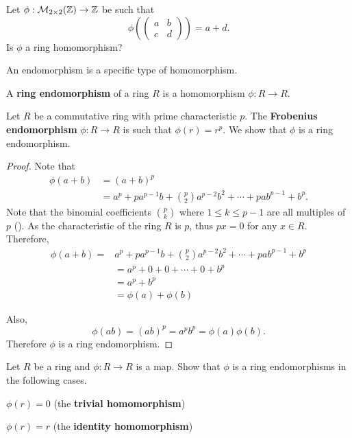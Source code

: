 \begin{exercise}
    Let $\phi: \mathcal{M}_{2\times2}(\mathbb{Z}) \to \mathbb{Z}$ be such that
    \[
        \phi\left(\begin{pmatrix}a&b\\c&d\end{pmatrix}\right) = a+d.
    \]
    Is $\phi$ a ring homomorphism?
\end{exercise}

An endomorphism is a specific type of homomorphism.
\begin{definition}
    A \textbf{ring endomorphism} of a ring $R$ is a homomorphism $\phi: R \to R$.
\end{definition}
\begin{example}
    Let $R$ be a commutative ring with prime characteristic $p$. The \textbf{Frobenius endomorphism} $\phi: R \to R$ is such that $\phi(r) = r^p$. We show that $\phi$ is a ring endomorphism.
    
    \begin{proof}
        Note that
        \begin{align*}
            \phi(a+b) &= (a+b)^p\\
            &= a^p + pa^{p-1}b + {p \choose 2}a^{p-2}b^2 + \cdots + pab^{p-1} + b^p.
        \end{align*}
        Note that the binomial coefficients ${p \choose k}$ where $1 \leq k \leq p -1$ are all multiples of $p$ (). As the characteristic of the ring $R$ is $p$, thus $px = 0$ for any $x \in R$. Therefore,
        \begin{align*}
            \phi(a+b) = &a^p + pa^{p-1}b + {p \choose 2}a^{p-2}b^2 + \cdots + pab^{p-1} + b^p\\
            &= a^p + 0 + 0 + \cdots + 0 + b^p\\
            &= a^p + b^p\\
            &=\phi(a) + \phi(b)
        \end{align*}

        Also,
        \[
            \phi(ab) = (ab)^p = a^pb^p = \phi(a)\phi(b).
        \]
        Therefore $\phi$ is a ring endomorphism.
    \end{proof}
\end{example}

\begin{exercise}
    Let $R$ be a ring and $\phi: R \to R$ is a map. Show that $\phi$ is a ring endomorphisms in the following cases.
    \begin{partquestions}{\alph*}
        \item $\phi(r) = 0$ (the \textbf{trivial homomorphism})
        \item $\phi(r) = r$ (the \textbf{identity homomorphism})
    \end{partquestions}
\end{exercise}

